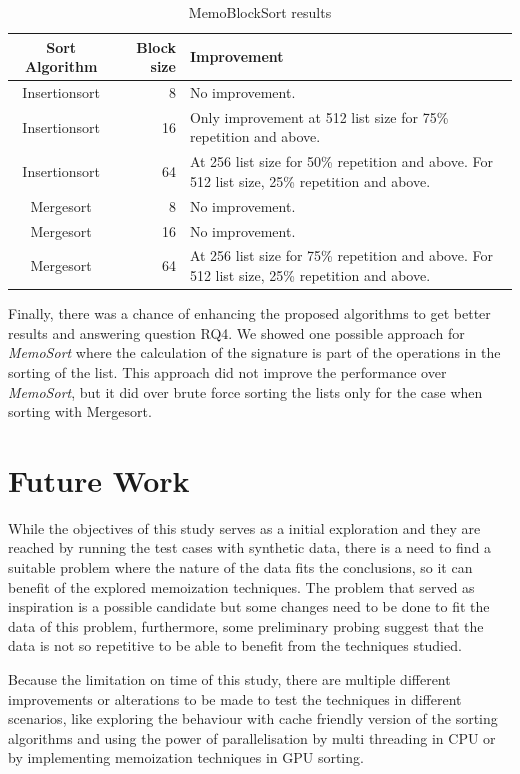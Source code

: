 \documentclass[a4paper,12pt]{article}
\begin{document}
\begin{table}[H]
\centering
\begin{tabular}{|c|r|p{80mm}|}  \hline
	{Sort Algorithm} & {Block size} & {Improvement} \\  \hline
	Insertionsort & 8 & No improvement. \\ 
	Insertionsort & 16 & Only improvement at 512 list size for 75\% repetition and above. \\ 
	Insertionsort & 64 & At  256 list size for 50\% repetition and above. For 512 list size, 25\% repetition and above.\\ 
	Mergesort & 8 &  No improvement. \\ 
	Mergesort & 16 & No improvement. \\ 
	Mergesort & 64 & At  256 list size for 75\% repetition and above. For 512 list size, 25\% repetition and above. \\  \hline
\end{tabular}
\caption{MemoBlockSort results}
\label{fig:MemoBlockSortResults}
\end{table}

Finally, there was a chance of enhancing the proposed algorithms to get better results and answering question RQ4. We showed one possible approach for  {\it MemoSort} where the calculation of the signature is part of the operations in the sorting of the list. This approach did not improve the performance over {\it MemoSort}, but it did over brute force sorting the lists only for the case when sorting with Mergesort. \\

\section{Future Work}

While the objectives of this study serves as a initial exploration and they are reached by running the test cases with synthetic data, there is a need to find a suitable problem where the nature of the data fits the conclusions, so it can benefit of  the explored memoization techniques. The problem that served as inspiration \cite{Arch2015} is a possible candidate but some changes need to be done to fit the data of this problem, furthermore, some preliminary probing suggest that the data is not so repetitive to be able to benefit from the techniques studied.

Because the limitation on time of this study, there are multiple different improvements or alterations to be made to test the techniques in different scenarios, like exploring the behaviour with cache friendly version of the sorting algorithms and using the power of parallelisation by multi threading in CPU or by implementing memoization techniques in GPU sorting.
\end{document}
